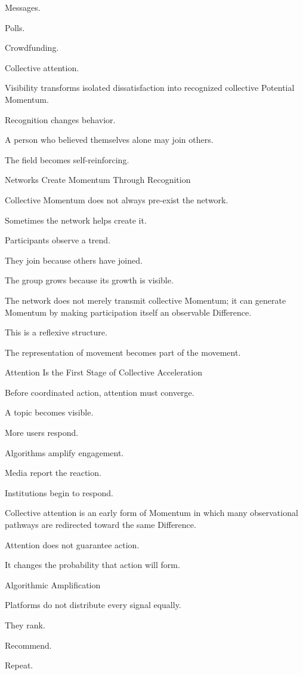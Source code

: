 Messages.

Polls.

Crowdfunding.

Collective attention.

Visibility transforms isolated dissatisfaction into recognized collective Potential Momentum.

Recognition changes behavior.

A person who believed themselves alone may join others.

The field becomes self-reinforcing.

Networks Create Momentum Through Recognition

Collective Momentum does not always pre-exist the network.

Sometimes the network helps create it.

Participants observe a trend.

They join because others have joined.

The group grows because its growth is visible.

The network does not merely transmit collective Momentum; it can generate Momentum by making participation itself an observable Difference.

This is a reflexive structure.

The representation of movement becomes part of the movement.

Attention Is the First Stage of Collective Acceleration

Before coordinated action, attention must converge.

A topic becomes visible.

More users respond.

Algorithms amplify engagement.

Media report the reaction.

Institutions begin to respond.

Collective attention is an early form of Momentum in which many observational pathways are redirected toward the same Difference.

Attention does not guarantee action.

It changes the probability that action will form.

Algorithmic Amplification

Platforms do not distribute every signal equally.

They rank.

Recommend.

Repeat.

